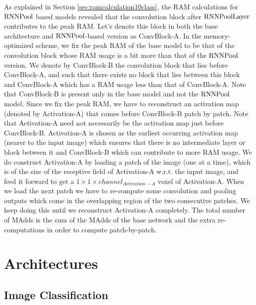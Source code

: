 \documentclass[10pt]{article}
\newcommand{\rpool}{\ensuremath{{\rm RNNPool}}\xspace}
\newcommand{\rpoollayer}{\ensuremath{{\rm RNNPoolLayer}}\xspace}
\begin{document}
As explained in Section \ref{sec:ramcalculation10class}, the RAM
calculations for \rpool based models revealed that the convolution
block after \rpoollayer contributes to the peak RAM. Let's denote this
block in both the base architecture and \rpool-based version as
ConvBlock-A. In the memory-optimized scheme, we fix the peak RAM of
the base model to be that of the convolution block whose RAM usage is
a bit more than that of the \rpool version. We denote by ConvBlock-B the
convolution block that lies before ConvBlock-A, and such that there
exists no block that lies between this block and ConvBlock-A which has
a RAM usage less than that of ConvBlock-A. Note that ConvBlock-B is
present only in the base model and not the \rpool model. Since we fix
the peak RAM, we have to reconstruct an activation map (denoted by
Activation-A) that comes before ConvBlock-B patch by patch. Note that Activation-A
need not necessarily be the activation map just before
ConvBlock-B. Activation-A is chosen as the earliest occurring
activation map (nearer to the input image) which ensures that there is no
intermediate layer or block between it and ConvBlock-B which can
contribute to more RAM usage. We do construct Activation-A
by loading a patch of the image (one at a time), which is of the size
of the receptive field of Activation-A w.r.t. the input image, and
feed it forward to get a $1 \times 1 \times channel_{Activation-A}$
voxel of Activation-A. When we load the next patch we have to
re-compute some convolution and pooling outputs which come in the
overlapping region of the two consecutive patches. We keep doing this
until we reconstruct Activation-A completely. The total number of MAdds is the sum of the MAdds of the base network and the extra re-computations in order to
compute patch-by-patch.
 \section{Architectures}
\label{sec:architectures}
\subsection{Image Classification}
\label{sec:arch-classification}
\end{document}

